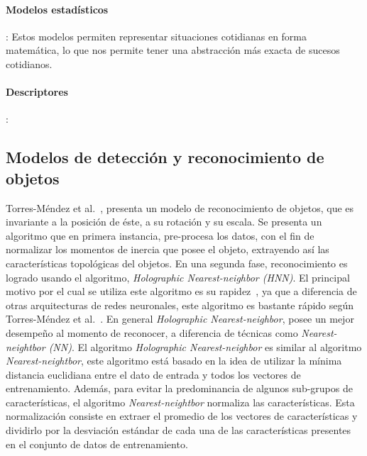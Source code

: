 \paragraph{Modelos estadísticos}: Estos modelos permiten representar situaciones cotidianas en forma matemática, lo que nos permite tener una abstracción más exacta de sucesos cotidianos.
\paragraph{Descriptores}:


\subsection{Modelos de detección y reconocimiento de objetos}
Torres-Méndez et al.~\cite{trsi2000}, presenta un modelo de reconocimiento de objetos, que es invariante a la posición de éste, a su rotación y su escala. Se presenta un algoritmo que en primera instancia, pre-procesa los datos, con el fin de normalizar los momentos de inercia que posee el objeto, extrayendo así las características topológicas del objetos. En una segunda fase, reconocimiento es logrado usando el algoritmo, \textit{Holographic Nearest-neighbor (HNN)}. El principal motivo por el cual se utiliza este algoritmo es su rapidez~\cite{trsi2000}, ya que a diferencia de otras arquitecturas de redes neuronales, este algoritmo es bastante rápido según Torres-Méndez et al.~\cite{trsi2000}. En general \textit{Holographic Nearest-neighbor}, posee un mejor desempeño al momento de reconocer, a diferencia de técnicas como \textit{Nearest-neightbor (NN)}. El algoritmo \textit{Holographic Nearest-neighbor} es similar al algoritmo \textit{Nearest-neightbor}, este algoritmo está basado en la idea de utilizar la mínima distancia euclidiana entre el dato de entrada y todos los vectores de entrenamiento. Además, para evitar la predominancia de algunos sub-grupos de características, el algoritmo \textit{Nearest-neightbor} normaliza las características. Esta normalización consiste en extraer el promedio de los vectores de características y dividirlo por la desviación estándar de cada una de las características presentes en el conjunto de datos de entrenamiento.

